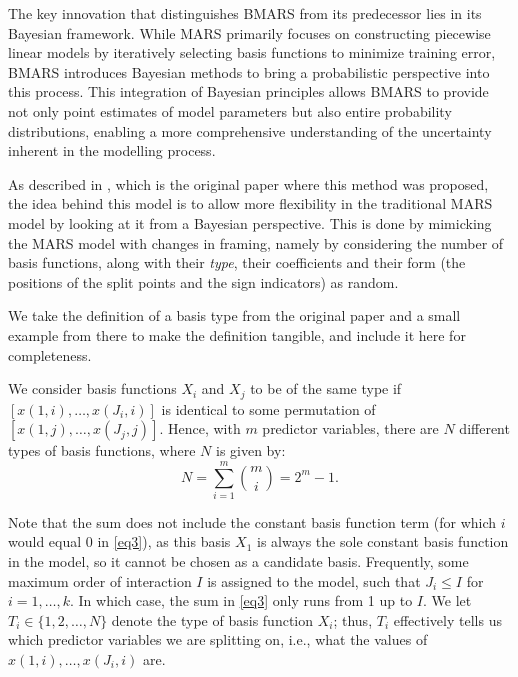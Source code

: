 The key innovation that distinguishes BMARS from its predecessor lies in its Bayesian framework. While MARS primarily focuses on constructing piecewise linear models by iteratively selecting basis functions to minimize training error, BMARS introduces Bayesian methods to bring a probabilistic perspective into this process. This integration of Bayesian principles allows BMARS to provide not only point estimates of model parameters but also entire probability distributions, enabling a more comprehensive understanding of the uncertainty inherent in the modelling process.

As described in \cite{denison1998bayesian}, which is the original paper where this method was proposed, the idea behind this model is to allow more flexibility in the traditional MARS model by looking at it from a Bayesian perspective. This is done by mimicking the MARS model with changes in framing, namely by considering the number of basis functions, along with their \textit{type}, their coefficients and their form (the positions of the split points and the sign indicators) as random. 

We take the definition of a basis type from the original paper and a small example from there to make the definition tangible, and include it here for completeness. 
\begin{definition}
	We consider basis functions $X_i$ and $X_j$ to be of the same type if $[x(1,i), \ldots, x(J_i,i)]$ is identical to some permutation of $[x(1,j), \ldots, x(J_j,j)]$. Hence, with $m$ predictor variables, there are $N$ different types of basis functions, where $N$ is given by:
	\begin{equation}
		N = \sum_{i=1}^{m} \binom{m}{i} = 2^m - 1. \label{eq3}
	\end{equation}	
\end{definition}

Note that the sum does not include the constant basis function term (for which $i$ would equal 0 in \eqref{eq3}), as this basis $X_1$ is always the sole constant basis function in the model, so it cannot be chosen as a candidate basis. Frequently, some maximum order of interaction $I$ is assigned to the model, such that $J_i \leq I$ for $i = 1, \ldots, k$. In which case, the sum in \eqref{eq3} only runs from 1 up to $I$. We let $T_i \in \{1, 2, \ldots, N\}$ denote the type of basis function $X_i$; thus, $T_i$ effectively tells us which predictor variables we are splitting on, i.e., what the values of $x(1,i), \ldots, x(J_i,i)$ are.

